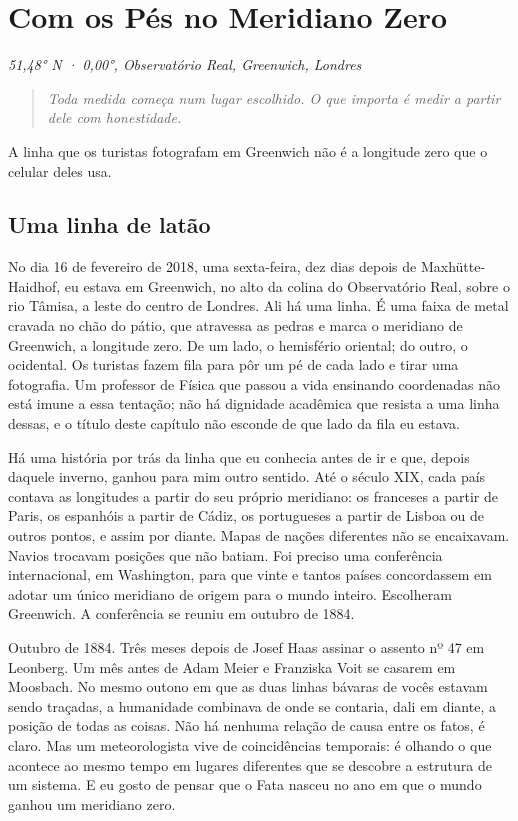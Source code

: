 \documentclass[
  brazilian,
  11pt,
  openany]{book}
\begin{document}
\chapter{Com os Pés no Meridiano Zero}\label{cap-19}

\emph{51,48° N · 0,00°, Observatório Real, Greenwich, Londres}

\begin{quote}
\emph{Toda medida começa num lugar escolhido. O que importa é medir a
partir dele com honestidade.}
\end{quote}

A linha que os turistas fotografam em Greenwich não é a longitude zero
que o celular deles usa.

\section{Uma linha de latão}\label{uma-linha-de-latuxe3o}

No dia 16 de fevereiro de 2018, uma sexta-feira, dez dias depois de
Maxhütte-Haidhof, eu estava em Greenwich, no alto da colina do
Observatório Real, sobre o rio Tâmisa, a leste do centro de Londres. Ali
há uma linha. É uma faixa de metal cravada no chão do pátio, que
atravessa as pedras e marca o meridiano de Greenwich, a longitude zero.
De um lado, o hemisfério oriental; do outro, o ocidental. Os turistas
fazem fila para pôr um pé de cada lado e tirar uma fotografia. Um
professor de Física que passou a vida ensinando coordenadas não está
imune a essa tentação; não há dignidade acadêmica que resista a uma
linha dessas, e o título deste capítulo não esconde de que lado da fila
eu estava.

Há uma história por trás da linha que eu conhecia antes de ir e que,
depois daquele inverno, ganhou para mim outro sentido. Até o século XIX,
cada país contava as longitudes a partir do seu próprio meridiano: os
franceses a partir de Paris, os espanhóis a partir de Cádiz, os
portugueses a partir de Lisboa ou de outros pontos, e assim por diante.
Mapas de nações diferentes não se encaixavam. Navios trocavam posições
que não batiam. Foi preciso uma conferência internacional, em
Washington, para que vinte e tantos países concordassem em adotar um
único meridiano de origem para o mundo inteiro. Escolheram Greenwich. A
conferência se reuniu em outubro de 1884.

Outubro de 1884. Três meses depois de Josef Haas assinar o assento nº 47
em Leonberg. Um mês antes de Adam Meier e Franziska Voit se casarem em
Moosbach. No mesmo outono em que as duas linhas bávaras de vocês estavam
sendo traçadas, a humanidade combinava de onde se contaria, dali em
diante, a posição de todas as coisas. Não há nenhuma relação de causa
entre os fatos, é claro. Mas um meteorologista vive de coincidências
temporais: é olhando o que acontece ao mesmo tempo em lugares diferentes
que se descobre a estrutura de um sistema. E eu gosto de pensar que o
Fata nasceu no ano em que o mundo ganhou um meridiano zero.
\end{document}
